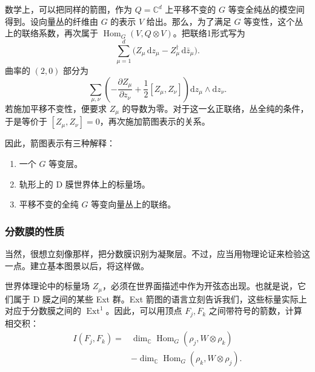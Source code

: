 数学上，可以把同样的箭图，作为 $Q=\mathbb{C}^d$ 上平移不变的 $G$ 等变全纯丛的模空间得到。设向量丛的纤维由 $G$ 的表示 $V$ 给出。那么，为了满足 $G$ 等变性，这个丛上的联络系数，再次属于 $\operatorname{Hom}_G(V,Q\otimes V)$。把联络1形式写为
\begin{equation}\label{eq:5.104}
\sum_{\mu=1}^d\bigl(Z_\mu\,\mathrm{d}z_\mu
-Z_\mu^\dagger\,\mathrm{d}\bar z_\mu\bigr).
\end{equation}
曲率的 $(2,0)$ 部分为
\begin{equation}\label{eq:5.105}
\sum_{\mu,\nu}\left(-\frac{\partial Z_\mu}{\partial z_\nu}
+\frac12[Z_\mu,Z_\nu]\right)\mathrm{d}z_\mu\wedge\mathrm{d}z_\nu.
\end{equation}
若施加平移不变性，便要求 $Z_\mu$ 的导数为零。对于这一幺正联络，丛全纯的条件，于是等价于 $[Z_\mu,Z_\nu]=0$，再次施加箭图表示的关系。

因此，箭图表示有三种解释：
\begin{enumerate}[label=(\arabic*)]
\item 一个 $G$ 等变层。
\item 轨形上的 D 膜世界体上的标量场。
\item 平移不变的全纯 $G$ 等变向量丛上的联络。
\end{enumerate}

\subsubsection{分数膜的性质}\label{sec:5.4.5.2}

当然，很想立刻像那样，把分数膜识别为凝聚层。不过，应当用物理论证来检验这一点。建立基本图景以后，将这样做。

世界体理论中的标量场 $Z_\mu$，必须在世界面描述中作为开弦态出现。也就是说，它们属于 D 膜之间的某些 Ext 群。Ext 箭图的语言立刻告诉我们，这些标量实际上对应于分数膜之间的 $\operatorname{Ext}^1$。因此，可以用顶点 $F_j,F_k$ 之间带符号的箭数，计算相交积：
\begin{equation}\label{eq:5.106}
\begin{aligned}
I(F_j,F_k)={}&\dim_{\mathbb C}\operatorname{Hom}_G(\rho_j,W\otimes\rho_k)\\
&-\dim_{\mathbb C}\operatorname{Hom}_G(\rho_k,W\otimes\rho_j).
\end{aligned}
\end{equation}

